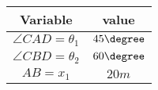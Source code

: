 \begin{tabular}{|c|c|}

   \hline
   \textbf{Variable} & \textbf{value}\\
   \hline
   $\angle CAD = \theta_1$ & $45\degree$\\
   \hline
   $\angle CBD = \theta_2$ & $60\degree$\\
   \hline
   $AB = x_1$ & $20m$\\ 
   \hline

\end{tabular}\\

